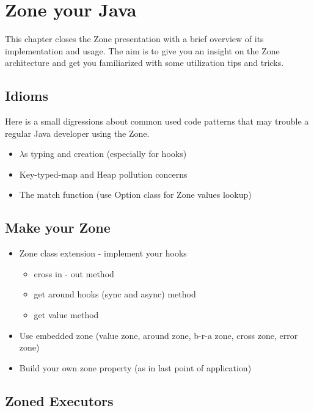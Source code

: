 
\chapter{Zone your Java}
\label{ch:impl}

This chapter closes the Zone presentation with a brief overview of its implementation and usage.
The aim is to give you an insight on the Zone architecture and get you familiarized with some utilization tips and tricks.

\section{Idioms}

Here is a small digressions about common used code patterns that may trouble a regular Java developer using the Zone.



\begin{itemize}
\item $\lambda$s typing and creation (especially for hooks)
\item Key-typed-map and Heap pollution concerns
\item The match function (use Option class for Zone values lookup)
\end{itemize}

\section{Make your Zone}

\begin{itemize}
\item Zone class extension - implement your hooks
  \begin{itemize}
  \item cross in - out method
  \item get around hooks (sync and async) method
  \item get value method
  \end{itemize}
\item Use embedded zone (value zone, around zone, b-r-a zone, cross zone, error zone)
\item Build your own zone property (as in last point of application)
\end{itemize}


\section{Zoned Executors}

